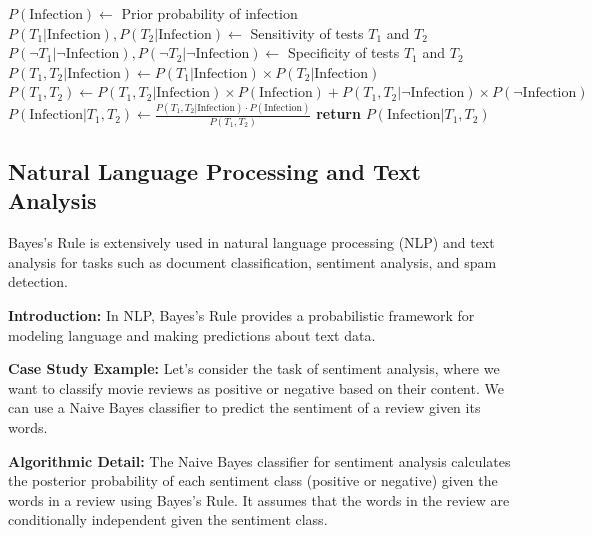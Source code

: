 \documentclass[12pt]{book} %
\begin{document}
\FloatBarrier
\begin{algorithm}
\caption{Medical Diagnosis using Bayes's Rule}\label{medical_diagnosis}
\begin{algorithmic}[1]
\State $P(\text{Infection}) \gets$ Prior probability of infection
\State $P(T_1 | \text{Infection}), P(T_2 | \text{Infection}) \gets$ Sensitivity of tests $T_1$ and $T_2$
\State $P(\neg T_1 | \neg \text{Infection}), P(\neg T_2 | \neg \text{Infection}) \gets$ Specificity of tests $T_1$ and $T_2$
\State $P(T_1, T_2 | \text{Infection}) \gets P(T_1 | \text{Infection}) \times P(T_2 | \text{Infection})$
\State $P(T_1, T_2) \gets P(T_1, T_2 | \text{Infection}) \times P(\text{Infection}) + P(T_1, T_2 | \neg \text{Infection}) \times P(\neg \text{Infection})$
\State $P(\text{Infection} | T_1, T_2) \gets \frac{P(T_1, T_2 | \text{Infection}) \cdot P(\text{Infection})}{P(T_1, T_2)}$
\State \textbf{return} $P(\text{Infection} | T_1, T_2)$ 
\EndProcedure
\end{algorithmic}
\end{algorithm}
\FloatBarrier

\subsection{Natural Language Processing and Text Analysis}

Bayes's Rule is extensively used in natural language processing (NLP) and text analysis for tasks such as document classification, sentiment analysis, and spam detection.

\textbf{Introduction:} In NLP, Bayes's Rule provides a probabilistic framework for modeling language and making predictions about text data.

\textbf{Case Study Example:} Let's consider the task of sentiment analysis, where we want to classify movie reviews as positive or negative based on their content. We can use a Naive Bayes classifier to predict the sentiment of a review given its words.

\textbf{Algorithmic Detail:}
The Naive Bayes classifier for sentiment analysis calculates the posterior probability of each sentiment class (positive or negative) given the words in a review using Bayes's Rule. It assumes that the words in the review are conditionally independent given the sentiment class.
\end{document}
